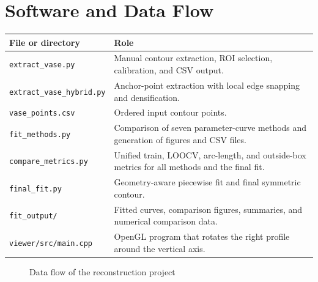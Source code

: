 \documentclass[a4paper,11pt]{article}
\begin{document}
\section{Software and Data Flow}

\begin{longtable}{p{}p{}}
\toprule
\textbf{File or directory} & \textbf{Role}\\
\midrule
\texttt{extract\_vase.py} & Manual contour extraction, ROI selection, calibration, and CSV output.\\
\texttt{extract\_vase\_hybrid.py} & Anchor-point extraction with local edge snapping and densification.\\
\texttt{vase\_points.csv} & Ordered input contour points.\\
\texttt{fit\_methods.py} & Comparison of seven parameter-curve methods and generation of figures and CSV files.\\
\texttt{compare\_metrics.py} & Unified train, LOOCV, arc-length, and outside-box metrics for all methods and the final fit.\\
\texttt{final\_fit.py} & Geometry-aware piecewise fit and final symmetric contour.\\
\texttt{fit\_output/} & Fitted curves, comparison figures, summaries, and numerical comparison data.\\
\texttt{viewer/src/main.cpp} & OpenGL program that rotates the right profile around the vertical axis.\\
\bottomrule
\end{longtable}

\begin{figure}[H]
\centering
{}
\caption{Data flow of the reconstruction project}
\end{figure}
\end{document}
